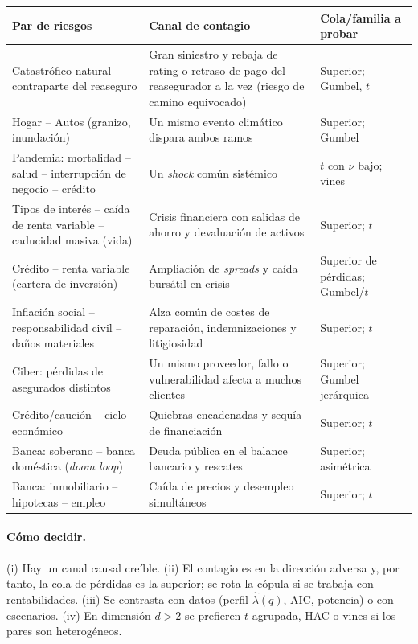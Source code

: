 \documentclass[a4paper,12pt]{article}
\begin{document}
\begin{center}
\small
\begin{tabular}{p{3.6cm}p{5.4cm}p{3.2cm}}
\toprule
Par de riesgos & Canal de contagio & Cola/familia a probar\\
\midrule
Catastrófico natural -- contraparte del reaseguro & Gran siniestro y rebaja de rating o retraso de pago del reasegurador a la vez (riesgo de camino equivocado) & Superior; Gumbel, $t$\\
Hogar -- Autos (granizo, inundación) & Un mismo evento climático dispara ambos ramos & Superior; Gumbel\\
Pandemia: mortalidad -- salud -- interrupción de negocio -- crédito & Un \emph{shock} común sistémico & $t$ con $\nu$ bajo; vines\\
Tipos de interés -- caída de renta variable -- caducidad masiva (vida) & Crisis financiera con salidas de ahorro y devaluación de activos & Superior; $t$\\
Crédito -- renta variable (cartera de inversión) & Ampliación de \emph{spreads} y caída bursátil en crisis & Superior de pérdidas; Gumbel/$t$\\
Inflación social -- responsabilidad civil -- daños materiales & Alza común de costes de reparación, indemnizaciones y litigiosidad & Superior; $t$\\
Ciber: pérdidas de asegurados distintos & Un mismo proveedor, fallo o vulnerabilidad afecta a muchos clientes & Superior; Gumbel jerárquica\\
Crédito/caución -- ciclo económico & Quiebras encadenadas y sequía de financiación & Superior; $t$\\
Banca: soberano -- banca doméstica (\emph{doom loop}) & Deuda pública en el balance bancario y rescates & Superior; asimétrica\\
Banca: inmobiliario -- hipotecas -- empleo & Caída de precios y desempleo simultáneos & Superior; $t$\\
\bottomrule
\end{tabular}
\end{center}

\paragraph{Cómo decidir.} (i) Hay un canal causal creíble. (ii) El contagio es en la dirección adversa y, por tanto, la cola de pérdidas es la superior; se rota la cópula si se trabaja con rentabilidades. (iii) Se contrasta con datos (perfil $\hat\lambda(q)$, AIC, potencia) o con escenarios. (iv) En dimensión $d>2$ se prefieren $t$ agrupada, HAC o vines si los pares son heterogéneos.
\end{document}
